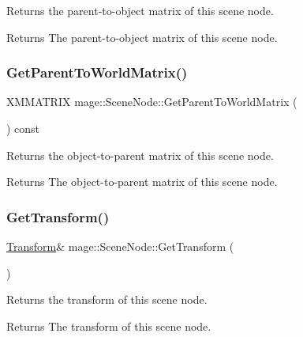 Returns the parent-\/to-\/object matrix of this scene node.

\begin{DoxyReturn}{Returns}
The parent-\/to-\/object matrix of this scene node. 
\end{DoxyReturn}
\hypertarget{classmage_1_1_scene_node_afb199589e809c3cb0e46a691a737e5da}{}\label{classmage_1_1_scene_node_afb199589e809c3cb0e46a691a737e5da} 
\subsubsection{\texorpdfstring{Get\+Parent\+To\+World\+Matrix()}{GetParentToWorldMatrix()}}
{\footnotesize\ttfamily X\+M\+M\+A\+T\+R\+IX mage\+::\+Scene\+Node\+::\+Get\+Parent\+To\+World\+Matrix (\begin{DoxyParamCaption}{ }\end{DoxyParamCaption}) const}

Returns the object-\/to-\/parent matrix of this scene node.

\begin{DoxyReturn}{Returns}
The object-\/to-\/parent matrix of this scene node. 
\end{DoxyReturn}
\hypertarget{classmage_1_1_scene_node_a72bfe51e9f233dd35fd8affd24b0a67a}{}\label{classmage_1_1_scene_node_a72bfe51e9f233dd35fd8affd24b0a67a} 
\subsubsection{\texorpdfstring{Get\+Transform()}{GetTransform()}\hspace{0.1cm}{\footnotesize\ttfamily [1/2]}}
{\footnotesize\ttfamily \hyperlink{structmage_1_1_transform}{Transform}\& mage\+::\+Scene\+Node\+::\+Get\+Transform (\begin{DoxyParamCaption}{ }\end{DoxyParamCaption})}

Returns the transform of this scene node.

\begin{DoxyReturn}{Returns}
The transform of this scene node. 
\end{DoxyReturn}
\hypertarget{classmage_1_1_scene_node_ab68ffa4886e8e5ff9757362823a1aa74}{}\label{classmage_1_1_scene_node_ab68ffa4886e8e5ff9757362823a1aa74} 
